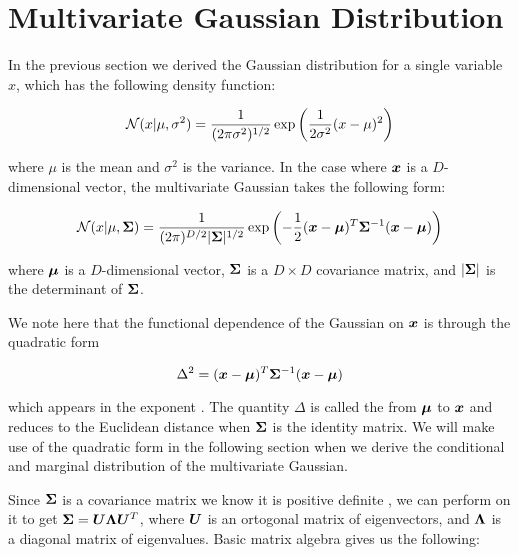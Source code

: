 \section{Multivariate Gaussian Distribution}

In the previous section we derived the Gaussian distribution for a single variable $x$, which has the following density function: 

\begin{equation}
{\mathcal{N}}(x | \mu, \sigma^2) = \frac{1}{(2 \pi \sigma^2)^{1/2}} \exp \left( \frac{1}{2\sigma^2} (x - \mu)^2 \right) \label{eq:single-gaussian}
\end{equation}

where $\mu$ is the mean and $\sigma^2$ is the variance. In the case where ${\bm{x}}$ is a $D$-dimensional vector, the multivariate Gaussian takes the following form:

\begin{equation}
{\mathcal{N}}(x | \mu, {\bm{\Sigma}}) = \frac{1}{(2 \pi)^{D/2} |{\bm{\Sigma}}|^{1/2}} \exp \left( -\frac{1}{2} ({\bm{x}} - {\bm{\mu}})^T {\bm{\Sigma}}^{-1} ({\bm{x}} - {\bm{\mu}}) \right) \label{eq:multi-gaussian}
\end{equation}

where ${\bm{\mu}}$ is a $D$-dimensional vector, ${\bm{\Sigma}}$ is a $D \times D$ covariance matrix, and $|{\bm{\Sigma}}|$ is the determinant of ${\bm{\Sigma}}$.

We note here that the functional dependence of the Gaussian on ${\bm{x}}$ is through the quadratic form

\begin{equation}
\Delta^2 = ({\bm{x}} - {\bm{\mu}})^T {\bm{\Sigma}}^{-1} ({\bm{x}} - {\bm{\mu}})
\end{equation}

which appears in the exponent \citep{bishop2016pattern} . The quantity $\Delta$ is called the  from ${\bm{\mu}}$ to ${\bm{x}}$ and reduces to the Euclidean distance when ${\bm{\Sigma}}$ is the identity matrix. We will make use of the quadratic form in the following section when we derive the conditional and marginal distribution of the multivariate Gaussian.

Since ${\bm{\Sigma}}$ is a covariance matrix we know it is positive definite , we can perform  on it to get ${\bm{\Sigma}} = {\bm{U}} {\bm{\Lambda}} {\bm{U}}^T$, where ${\bm{U}}$ is an ortogonal matrix of eigenvectors, and ${\bm{\Lambda}}$ is a diagonal matrix of eigenvalues. Basic matrix algebra gives us the following:

